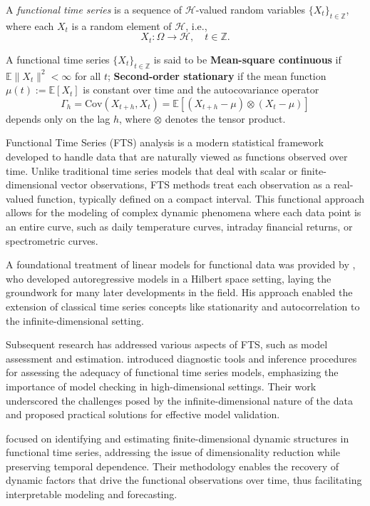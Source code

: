 \documentclass[
	12pt,				%
	oneside,			%
	a4paper,			%
	english,			%
	brazil				%
	]{abntex2ppgsi}
\begin{document}
A \emph{functional time series} is a sequence of $\mathcal{H}$-valued random variables $\{X_t\}_{t \in \mathbb{Z}}$, where each $X_t$ is a random element of $\mathcal{H}$, i.e.,
\[
X_t : \Omega \to \mathcal{H}, \quad t \in \mathbb{Z}.
\]

A functional time series $\{X_t\}_{t \in \mathbb{Z}}$ is said to be \textbf{Mean-square continuous} if $\mathbb{E}\|X_t\|^2 < \infty$ for all $t$; \textbf{Second-order stationary} if the mean function $\mu(t) := \mathbb{E}[X_t]$ is constant over time and the autocovariance operator 
    \[
    \Gamma_h = \text{Cov}(X_{t+h}, X_t) = \mathbb{E}[(X_{t+h} - \mu) \otimes (X_t - \mu)]
    \]
    depends only on the lag $h$, where $\otimes$ denotes the tensor product.


Functional Time Series (FTS) analysis is a modern statistical framework developed to handle data that are naturally viewed as functions observed over time. Unlike traditional time series models that deal with scalar or finite-dimensional vector observations, FTS methods treat each observation as a real-valued function, typically defined on a compact interval. This functional approach allows for the modeling of complex dynamic phenomena where each data point is an entire curve, such as daily temperature curves, intraday financial returns, or spectrometric curves.

A foundational treatment of linear models for functional data was provided by , who developed autoregressive models in a Hilbert space setting, laying the groundwork for many later developments in the field. His approach enabled the extension of classical time series concepts like stationarity and autocorrelation to the infinite-dimensional setting.

Subsequent research has addressed various aspects of FTS, such as model assessment and estimation.  introduced diagnostic tools and inference procedures for assessing the adequacy of functional time series models, emphasizing the importance of model checking in high-dimensional settings. Their work underscored the challenges posed by the infinite-dimensional nature of the data and proposed practical solutions for effective model validation.

 focused on identifying and estimating finite-dimensional dynamic structures in functional time series, addressing the issue of dimensionality reduction while preserving temporal dependence. Their methodology enables the recovery of dynamic factors that drive the functional observations over time, thus facilitating interpretable modeling and forecasting.
\end{document}
